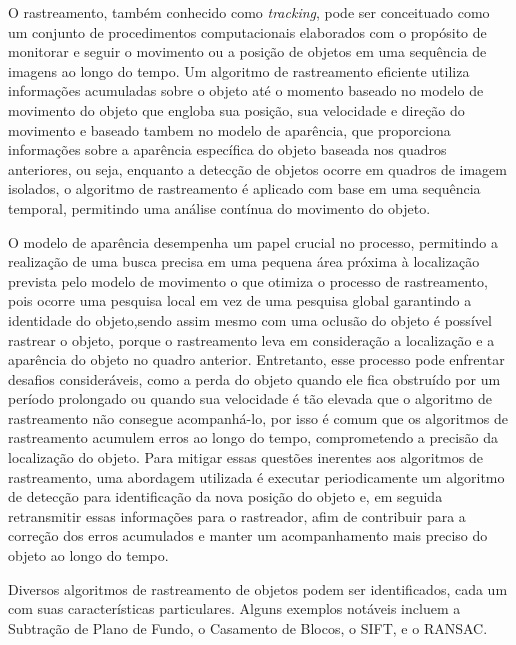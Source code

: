 O rastreamento, também conhecido como \textit{tracking}, pode ser conceituado como um conjunto de procedimentos computacionais elaborados com o propósito de monitorar e seguir o movimento ou a posição de objetos em uma sequência de imagens ao longo do tempo. Um algoritmo de rastreamento eficiente utiliza informações acumuladas sobre o objeto até o momento baseado no modelo de movimento do objeto que engloba  sua posição, sua velocidade e direção do movimento e baseado tambem no modelo de aparência, que proporciona informações sobre a aparência específica do objeto baseada nos quadros anteriores, ou seja,  enquanto a detecção de objetos ocorre em quadros de imagem isolados, o algoritmo de rastreamento é aplicado com base em uma sequência temporal, permitindo uma análise contínua do movimento do objeto\cite{tracking}.

O modelo de aparência desempenha um papel crucial no processo, permitindo a realização de uma busca precisa em uma pequena área próxima à localização prevista pelo modelo de movimento o que  otimiza o processo de rastreamento, pois ocorre uma pesquisa local em vez de uma pesquisa global garantindo a identidade do objeto,sendo assim mesmo com uma oclusão do objeto é possível rastrear o objeto, porque o rastreamento leva em consideração a localização e a aparência do objeto no quadro anterior. Entretanto, esse processo pode enfrentar desafios consideráveis, como a perda do objeto quando ele fica obstruído por um período prolongado ou quando sua velocidade é tão elevada que o algoritmo de rastreamento não consegue acompanhá-lo, por isso é comum que os algoritmos de rastreamento acumulem erros ao longo do tempo, comprometendo a precisão da localização do objeto. Para mitigar essas questões inerentes aos algoritmos de rastreamento, uma abordagem utilizada é executar periodicamente um algoritmo de detecção para identificação da nova posição do objeto e, em seguida retransmitir essas informações para o rastreador, afim de contribuir para a correção dos erros acumulados e manter um acompanhamento mais preciso do objeto ao longo do tempo\cite{tracking}.


Diversos algoritmos de rastreamento de objetos podem ser identificados, cada um com suas características particulares. Alguns exemplos notáveis incluem a Subtração de Plano de Fundo, o Casamento de Blocos, o \ac{SIFT}, e o \ac{RANSAC}.

